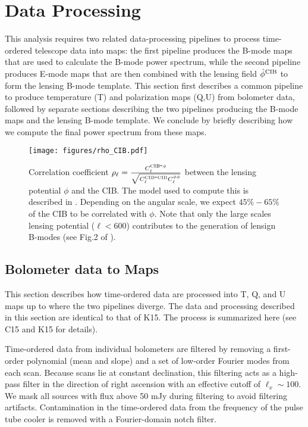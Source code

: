 \section{Data Processing}
\label{sec:processing}
This analysis requires two related data-processing pipelines to process time-ordered telescope data into maps:
the first pipeline produces the B-mode maps that are used to calculate the B-mode power spectrum,
while the second pipeline produces E-mode maps that are then combined with the lensing field $\hat{\phi}^{\rm CIB}$ to form the lensing B-mode template.
This section first describes a common pipeline to produce temperature (T) and polarization maps (Q,U) from bolometer data, followed by separate sections describing the two pipelines producing the B-mode maps and the lensing B-mode template.
We conclude by briefly describing how we compute the final power spectrum from these maps.
\begin{figure}
\begin{center}
\texttt{[image: figures/rho\_CIB.pdf]}
\caption{Correlation coefficient $\rho_{\ell} = \frac{C_{\ell}^{{\rm CIB}\mbox{-}\phi}} {\sqrt{C_{\ell}^{{\rm CIB}\mbox{-}{\rm CIB}} C_{\ell}^{\phi\phi}}}$ between the lensing potential $\phi$ and the CIB. The model used to compute this is described in . Depending on the angular scale, we expect $45\%-65\%$ of the CIB to be correlated with $\phi$. Note that only the large scales lensing potential ($\ell<600$) contributes to the generation of lensign B-modes (see Fig.2 of \citep{simard:2015}).
}
\label{fig:CIB}
\end{center}
\end{figure}



\subsection{Bolometer data to Maps}
\label{sec:processing_maps}
This section describes how time-ordered data are processed into T, Q, and U maps up to where the two pipelines diverge.
The data and processing described in this section are identical to that of K15.
The process is summarized here (see C15 and K15 for details).

Time-ordered data from individual bolometers are filtered by removing a first-order polynomial (mean and slope) and a set of low-order Fourier modes from each scan.
Because scans lie at constant declination, this filtering acts as a high-pass filter in the direction of right ascension with an effective cutoff of $\ell_x \sim 100$.
We mask all sources with flux above 50 mJy during filtering to avoid filtering artifacts.
Contamination in the time-ordered data from the frequency of the pulse tube cooler is removed with a Fourier-domain notch filter.

